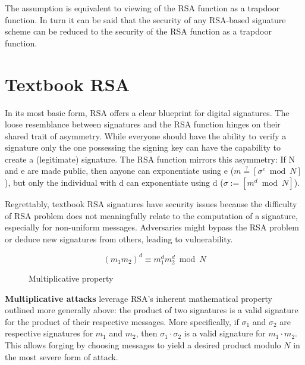\documentclass[]{final_report}
\theoremstyle{definition}
\begin{document}
The assumption is equivalent to viewing of the RSA function as a trapdoor function. In turn it can be said that the security of any RSA-based signature scheme can be reduced to the security of the RSA function as a trapdoor function.


\section{Textbook RSA}
In its most basic form, RSA offers a clear blueprint for digital signatures. The loose resemblance between signatures and the RSA function hinges on their shared trait of asymmetry. While everyone should have the ability to verify a signature only the one possessing the signing key can have the capability to create a (legitimate) signature. The RSA function mirrors this asymmetry: If N and e are made public, then anyone can exponentiate using e ($m \stackrel{?}{=} [\sigma^e \bmod N]$), but only the individual with d can exponentiate using d ($\sigma := [m^d \bmod N]$). 

Regrettably, textbook RSA signatures have security issues because the difficulty of RSA problem does not meaningfully relate to the computation of a signature, especially for non-uniform messages. Adversaries might bypass the RSA problem or deduce new signatures from others, leading to vulnerability.


\begin{figure}[H]
\caption{Multiplicative property}
\begin{equation}
(m_{1}m_{2})^{d} \equiv m_{1}^{d}m_{2}^{d} \bmod N
\end{equation}

\end{figure}
\textbf{Multiplicative attacks} leverage RSA’s inherent mathematical property outlined more generally above: the product of two signatures is a valid signature for the product of their respective messages. More specifically, if \( \sigma_{1} \) and \( \sigma_{2} \) are respective signatures for \( m_{1} \) and \( m_{2} \), then \( \sigma_{1} \cdot \sigma_{2} \) is a valid signature for \( m_{1} \cdot m_{2} \). This allows forging by choosing messages to yield a desired product modulo \( N \) in the most severe form of attack.

\end{document}
